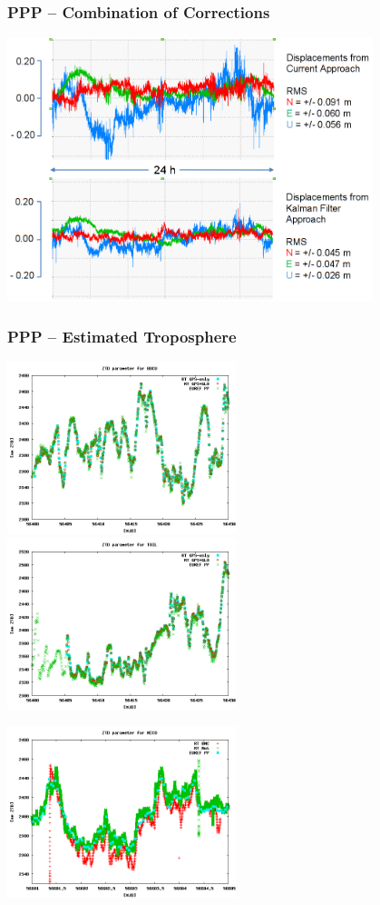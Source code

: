 \documentclass[10pt]{beamer}
\begin{document}

\begin{frame}
\frametitle{PPP -- Combination of Corrections}
  \begin{center}
    \includegraphics[width=0.8\textwidth,angle=0]{combination_3.png}
  \end{center}
\end{frame}


\begin{frame}
\frametitle{PPP -- Estimated Troposphere}
\includegraphics[width=0.5\textwidth,angle=0]{tropo1.png}
\includegraphics[width=0.5\textwidth,angle=0]{tropo2.png}

\includegraphics[width=0.5\textwidth,angle=0]{tropo3.png}
\end{frame}
\end{document}
